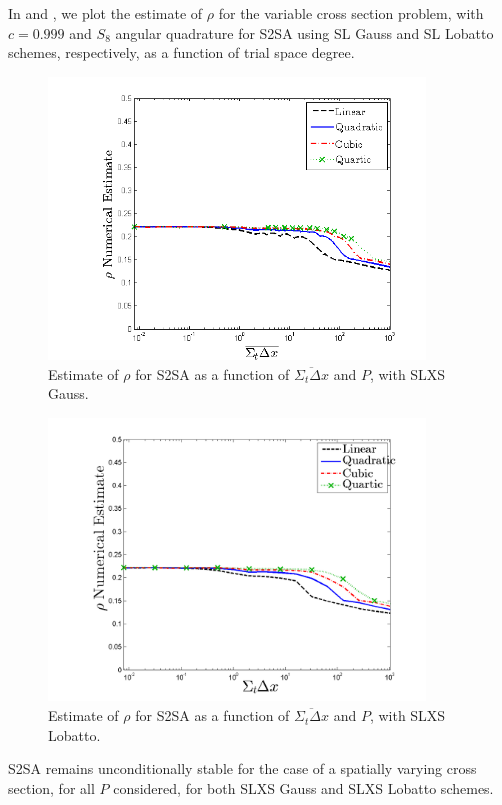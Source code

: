 In  and , we plot the estimate of $\rho$ for the variable cross section problem, with $c=0.999$ and $S_8$ angular quadrature for S2SA using SL Gauss and SL Lobatto schemes, respectively, as a function of trial space degree.
\begin{figure}[!htp]
\centering
\includegraphics[width=10cm]{chapter4_acceleration/Variable_XS_S2SA_Gauss_spr.png}
\caption{Estimate of $\rho$ for S2SA as a function of $\overline{\Sigma_t \Delta x}$ and $P$, with SLXS Gauss.}
\label{fig:varxs_s2sa_gauss}
\end{figure}
%
%
\begin{figure}[!htp]
\centering
\includegraphics[width=10cm]{chapter4_acceleration/Variable_XS_S2SA_Lobatto_spr.png}
\caption{Estimate of $\rho$ for S2SA as a function of $\overline{\Sigma_t \Delta x}$ and $P$, with SLXS Lobatto.}
\label{fig:varxs_s2sa_lobatto}
\end{figure}
S2SA remains unconditionally stable for the case of a spatially varying cross section, for all $P$ considered, for both SLXS Gauss and SLXS Lobatto schemes.

